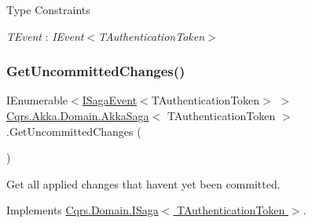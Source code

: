 \begin{Desc}
\item[Type Constraints]\begin{description}
\item[{\em T\+Event} : {\em I\+Event$<$T\+Authentication\+Token$>$}]\end{description}
\end{Desc}
\mbox{\label{classCqrs_1_1Akka_1_1Domain_1_1AkkaSaga_ac88061e29e3e2223db31ce9075835b46_ac88061e29e3e2223db31ce9075835b46}} 
\subsubsection{\texorpdfstring{Get\+Uncommitted\+Changes()}{GetUncommittedChanges()}}
{\footnotesize\ttfamily I\+Enumerable$<$\hyperlink{interfaceCqrs_1_1Events_1_1ISagaEvent}{I\+Saga\+Event}$<$T\+Authentication\+Token$>$ $>$ \hyperlink{classCqrs_1_1Akka_1_1Domain_1_1AkkaSaga}{Cqrs.\+Akka.\+Domain.\+Akka\+Saga}$<$ T\+Authentication\+Token $>$.Get\+Uncommitted\+Changes (\begin{DoxyParamCaption}{ }\end{DoxyParamCaption})}



Get all applied changes that haven\textquotesingle{}t yet been committed. 



Implements \hyperlink{interfaceCqrs_1_1Domain_1_1ISaga_abb77811b4f7d19adb61f9d33da18e7e0_abb77811b4f7d19adb61f9d33da18e7e0}{Cqrs.\+Domain.\+I\+Saga$<$ T\+Authentication\+Token $>$}.

\mbox{\label{classCqrs_1_1Akka_1_1Domain_1_1AkkaSaga_a40b859bc15c2f7c87a21b07f9bc9548c_a40b859bc15c2f7c87a21b07f9bc9548c}} 
